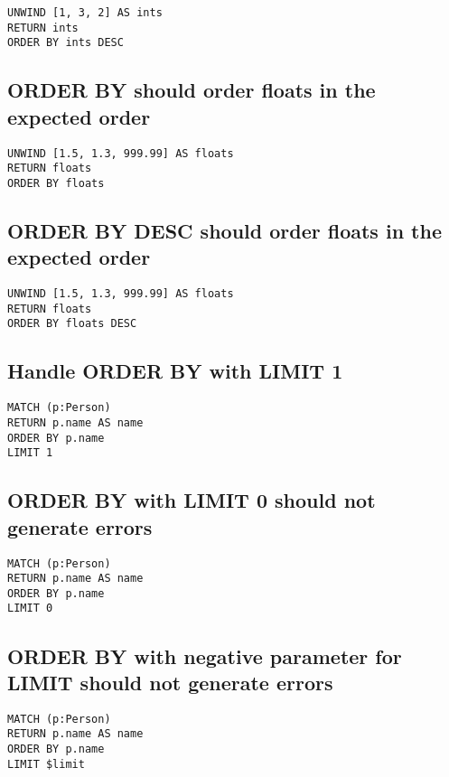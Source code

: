 \begin{lstlisting}
UNWIND [1, 3, 2] AS ints
RETURN ints
ORDER BY ints DESC
\end{lstlisting}

\subsection{ORDER BY should order floats in the expected order}

\begin{lstlisting}
UNWIND [1.5, 1.3, 999.99] AS floats
RETURN floats
ORDER BY floats
\end{lstlisting}

\subsection{ORDER BY DESC should order floats in the expected order}

\begin{lstlisting}
UNWIND [1.5, 1.3, 999.99] AS floats
RETURN floats
ORDER BY floats DESC
\end{lstlisting}

\subsection{Handle ORDER BY with LIMIT 1}

\begin{lstlisting}
MATCH (p:Person)
RETURN p.name AS name
ORDER BY p.name
LIMIT 1
\end{lstlisting}

\subsection{ORDER BY with LIMIT 0 should not generate errors}

\begin{lstlisting}
MATCH (p:Person)
RETURN p.name AS name
ORDER BY p.name
LIMIT 0
\end{lstlisting}

\subsection{ORDER BY with negative parameter for LIMIT should not generate errors}

\begin{lstlisting}
MATCH (p:Person)
RETURN p.name AS name
ORDER BY p.name
LIMIT $limit
\end{lstlisting}

